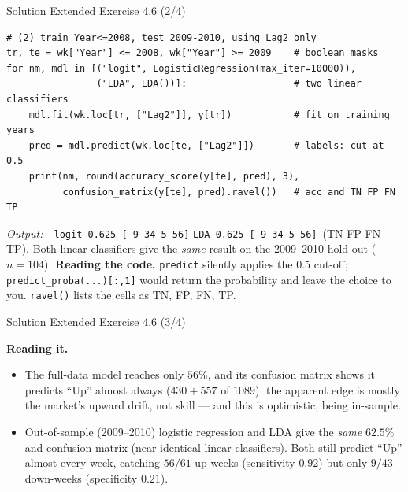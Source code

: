 \documentclass[aspectratio=169,11pt]{beamer}
\begin{document}
\begin{frame}[fragile]{Solution \textemdash{} Extended Exercise 4.6 (2/4)}
\begin{solutionbox}
\begin{lstlisting}
# (2) train Year<=2008, test 2009-2010, using Lag2 only
tr, te = wk["Year"] <= 2008, wk["Year"] >= 2009    # boolean masks
for nm, mdl in [("logit", LogisticRegression(max_iter=10000)),
                ("LDA", LDA())]:                   # two linear classifiers
    mdl.fit(wk.loc[tr, ["Lag2"]], y[tr])           # fit on training years
    pred = mdl.predict(wk.loc[te, ["Lag2"]])       # labels: cut at 0.5
    print(nm, round(accuracy_score(y[te], pred), 3),
          confusion_matrix(y[te], pred).ravel())   # acc and TN FP FN TP
\end{lstlisting}
\emph{Output:}\ \ \texttt{logit 0.625 [ 9 34 5 56]}\quad
\texttt{LDA 0.625 [ 9 34 5 56]}\ (TN FP FN TP). Both linear classifiers
give the \emph{same} result on the 2009--2010 hold-out ($n=104$).
\smallskip
\textbf{Reading the code.} \texttt{predict} silently applies the $0.5$
cut-off; \texttt{predict\_proba(...)[:,1]} would return the probability
and leave the choice to you. \texttt{ravel()} lists the cells as
TN, FP, FN, TP.
\end{solutionbox}
\end{frame}

\begin{frame}{Solution \textemdash{} Extended Exercise 4.6 (3/4)}
\begin{solutionbox}
\textbf{Reading it.}
\begin{itemize}
  \item The full-data model reaches only $56\%$, and its confusion matrix
        shows it predicts ``Up'' almost always ($430+557$ of $1089$): the
        apparent edge is mostly the market's upward drift, not skill ---
        and this is optimistic, being in-sample.
  \item Out-of-sample (2009--2010) logistic regression and LDA give the
        \emph{same} $62.5\%$ and confusion matrix (near-identical linear
        classifiers). Both still predict ``Up'' almost every week, catching
        $56/61$ up-weeks (sensitivity $0.92$) but only $9/43$ down-weeks
        (specificity $0.21$).
  \end{itemize}
\end{solutionbox}
\end{frame}
\end{document}

